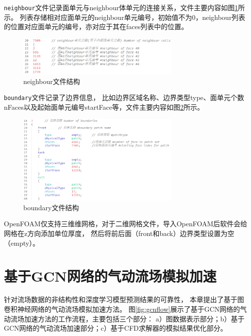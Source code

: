 \texttt{neighbour}文件记录面单元与neighbour体单元的连接关系，文件主要内容如图\ref{fig:neighbour_file}所示。
列表存储相对应面单元的neighbour单元编号，初始值不为0，neighbour列表的位置对应面单元的编号，亦对应于其在faces列表中的位置。

\begin{figure}[htp]
	\centering
	\includegraphics[width=0.72\textwidth]{./figures/neighbour.png}
	\caption{neighbour文件结构}
	\label{fig:neighbour_file}	
\end{figure}

\texttt{boundary}文件记录了边界信息，
比如边界区域名称、边界类型type、面单元个数nFaces以及起始面单元编号startFace等，文件主要内容如图\ref{fig:boundary_file}所示。

\begin{figure}[htp]
	\centering
	\includegraphics[width=0.72\textwidth]{./figures/boundary.png}
	\caption{boundary文件结构}
	\label{fig:boundary_file}	
\end{figure}

\noindent OpenFOAM仅支持三维维网格，对于二维网格文件，导入OpenFOAM后软件会给网格在z方向添加单位厚度，
然后将前后面（front和back）边界类型设置为空（empty）。


\section{基于GCN网络的气动流场模拟加速}

针对流场数据的非结构性和深度学习模型预测结果的可靠性，
本章提出了基于图卷积神经网络的气动流场模拟加速方法。
图\ref{fig:gcnflow}展示了基于GCN网络的气动流场加速方法的工作流程，主要包括三个部分：
a）图数据表示部分；b）基于GCN网络的气动流场加速部分；c）基于CFD求解器的模拟结果优化部分。

